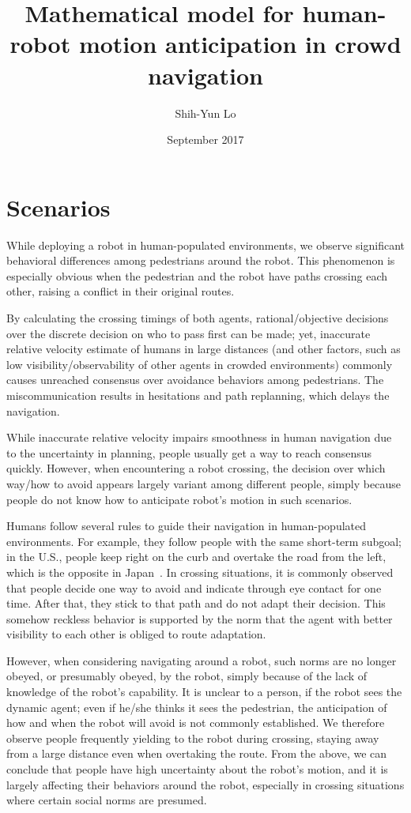 \documentclass{article}
\title{Mathematical model for human-robot motion anticipation in crowd navigation}
\author{Shih-Yun Lo}
\date{September 2017}
\begin{document}
\maketitle

\section{Scenarios}
While deploying a robot in human-populated environments, we observe significant behavioral differences among pedestrians around the robot. This phenomenon is especially obvious when the pedestrian and the robot have paths crossing each other, raising a conflict in their original routes. 

By calculating the crossing timings of both agents, rational/objective decisions over the discrete decision on who to pass first can be made; yet, inaccurate relative velocity estimate of humans in large distances (and other factors, such as low visibility/observability of other agents in crowded environments) commonly causes unreached consensus over avoidance behaviors among pedestrians. The miscommunication results in hesitations and path replanning, which delays the navigation.

While inaccurate relative velocity impairs smoothness in human navigation due to the uncertainty in planning, people usually get a way to reach consensus quickly. However, when encountering a robot crossing, the decision over which way/how to avoid appears largely variant among different people, simply because people do not know how to anticipate robot's motion in such scenarios.

Humans follow several rules to guide their navigation in human-populated environments. For example, they follow people with the same short-term subgoal; in the U.S., people keep right on the curb and overtake the road from the left, which is the opposite in Japan~\cite{zanlungo2012microscopic}. In crossing situations, it is commonly observed that people decide one way to avoid and indicate through eye contact for one time. After that, they stick to that path and do not adapt their decision. This somehow reckless behavior is supported by the norm that the agent with better visibility to each other is obliged to route adaptation.

However, when considering navigating around a robot, such norms are no longer obeyed, or presumably obeyed, by the robot, simply because of the lack of knowledge of the robot's capability. It is unclear to a person, if the robot sees the dynamic agent; even if he/she thinks it sees the pedestrian, the anticipation of how and when the robot will avoid is not commonly established. We therefore observe people frequently yielding to the robot during crossing, staying away from a large distance even when overtaking the route. From the above, we can conclude that people have high uncertainty about the robot's motion, and it is largely affecting their behaviors around the robot, especially in crossing situations where certain social norms are presumed.
\end{document}
